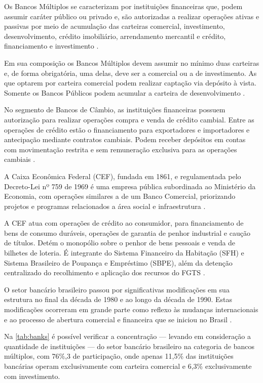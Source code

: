 \documentclass[12pt,12pt,openright,oneside,a4paper,chapter=TITLE,section=TITLE,subsection=TITLE,subsubsection=TITLE english,french,spanish,portugues,sumario=tradicional]{abntex2}
\begin{document}
Os Bancos Múltiplos se caracterizam por instituições financeiras que, podem
assumir caráter público ou privado e, são autorizadas a realizar operações
ativas e passivas por meio de acumulação das carteiras comercial, investimento,
desenvolvimento, crédito imobiliário, arrendamento mercantil e crédito, financiamento e investimento \cite{Res:2099:1994}.

Em sua composição os Bancos Múltiplos devem assumir no mínimo duas carteiras e,
de forma obrigatória, uma delas, deve ser a comercial ou a de investimento. As
que optarem por carteira comercial podem realizar captação via depósito à vista. Somente os Bancos Públicos podem acumular a carteira de desenvolvimento
\cite{Res:2099:1994}.

No segmento de Bancos de Câmbio, as instituições financeiras possuem
autorização para realizar operações compra e venda de crédito cambial. Entre as
operações de crédito estão o financiamento para exportadores e importadores e
antecipação mediante contratos cambiais. Podem receber depósitos em contas com
movimentação restrita e sem remuneração exclusiva para as operações cambiais
\cite{Res:3426:2006}.

A Caixa Econômica Federal (CEF), fundada em 1861, e regulamentada pelo
Decreto-Lei nº 759 de 1969 é uma empresa pública subordinada ao Ministério da
Economia, com operações similares a de um Banco Comercial, priorizando projetos
e programas relacionados a área social e infraestrutura \cite{DL:759:1969}.

A CEF atua com operações de crédito ao consumidor, para financiamento de bens
de consumo duráveis, operações de garantia de penhor industrial e caução de
títulos. Detém o monopólio sobre o penhor de bens pessoais e venda de bilhetes
de loteria. É integrante do Sistema Financeiro da Habitação (SFH) e Sistema
Brasileiro de Poupança e Empréstimo (SBPE), além da detenção centralizado do
recolhimento e aplicação dos recursos do FGTS \cite{DL:759:1969}.

O setor bancário brasileiro passou por significativas modificações em sua
estrutura no final da década de 1980 e ao longo da década de 1990. Estas
modificações ocorreram em grande parte como reflexo às mudanças internacionais
e ao processo de abertura comercial e financeira que se iniciou no Brasil
\cite{camargo:2009}.

Na \autoref{tab:banks} é possível verificar a concentração --- levando em
consideração a quantidade de instituições --- do setor bancário brasileiro na
categoria de bancos múltiplos, com 76\%,3 de participação, onde apenas 11,5\% das
instituições bancárias operam exclusivamente com carteira comercial e 6,3\%
exclusivamente com investimento.
\end{document}

